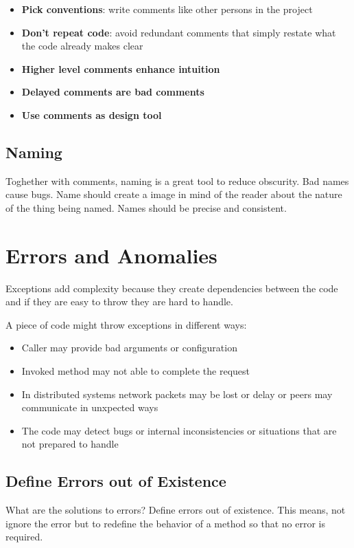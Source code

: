 \begin{itemize}
  \item \textbf{Pick conventions}: write comments like other persons in the project
  \item \textbf{Don't repeat code}: avoid redundant comments that simply restate what the code already makes clear
  \item \textbf{Higher level comments enhance intuition}
  \item \textbf{Delayed comments are bad comments}
  \item \textbf{Use comments as design tool}
\end{itemize}


\subsection{Naming}
Toghether with comments, naming is a great tool to reduce obscurity. Bad names cause bugs.
Name should create a image in mind of the reader about the nature of the thing being named.
Names should be precise and consistent.

\section{Errors and Anomalies}
Exceptions add complexity because they create dependencies between the code and if they are easy
to throw they are hard to handle.

A piece of code might throw exceptions in different ways:

\begin{itemize}
  \item Caller may provide bad arguments or configuration
  \item Invoked method may not able to complete the request
  \item In distributed systems network packets may be lost or delay or peers may communicate in unxpected ways
  \item The code may detect bugs or internal inconsistencies or situations that are not prepared to handle
\end{itemize}

\subsection{Deﬁne Errors out of Existence}
What are the solutions to errors? Define errors out of existence.
This means, not ignore the error but to redefine the behavior of a method so that no error is
required.


